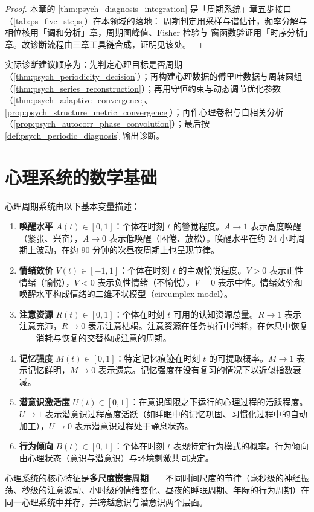 \begin{proof}
本章的 \cref{thm:psych_diagnosis_integration} 是「周期系统」章五步接口（\cref{tab:ps_five_steps}）在本领域的落地：
周期判定用采样与谱估计，频率分解与相位核用「调和分析」章，周期图峰值、Fisher 检验与
窗函数验证用「时序分析」章。故诊断流程由三章工具链合成，证明见该处。
\end{proof}

\begin{remark}[整合后的操作顺序]\label{rem:psych_integration_order}
实际诊断建议顺序为：先判定心理目标是否周期（\cref{thm:psych_periodicity_decision}）；再构建心理数据的傅里叶数据与周转圆组（\cref{thm:psych_series_reconstruction}）；再用守恒约束与动态调节优化参数（\cref{thm:psych_adaptive_convergence}、\cref{prop:psych_structure_metric_convergence}）；再作心理卷积与自相关分析（\cref{prop:psych_autocorr_phase_convolution}）；最后按 \cref{def:psych_periodic_diagnosis} 输出诊断。
\end{remark}

\section{心理系统的数学基础}

\begin{definition}[心理周期系统的基本量]\label{def:psychological_quantities}
心理周期系统由以下基本变量描述：
\begin{enumerate}[label=(\roman*)]
    \item \textbf{唤醒水平} $A(t) \in [0,1]$：个体在时刻 $t$ 的警觉程度。$A \to 1$ 表示高度唤醒（紧张、兴奋），$A \to 0$ 表示低唤醒（困倦、放松）。唤醒水平在约 24 小时周期上波动，在约 90 分钟的次昼夜周期上也呈现节律。
    \item \textbf{情绪效价} $V(t) \in [-1,1]$：个体在时刻 $t$ 的主观愉悦程度。$V > 0$ 表示正性情绪（愉悦），$V < 0$ 表示负性情绪（不愉悦），$V = 0$ 表示中性。情绪效价和唤醒水平构成情绪的二维环状模型（circumplex model）。
    \item \textbf{注意资源} $R(t) \in [0,1]$：个体在时刻 $t$ 可用的认知资源总量。$R \to 1$ 表示注意充沛，$R \to 0$ 表示注意枯竭。注意资源在任务执行中消耗，在休息中恢复——消耗与恢复的交替构成注意的周期。
    \item \textbf{记忆强度} $M(t) \in [0,1]$：特定记忆痕迹在时刻 $t$ 的可提取概率。$M \to 1$ 表示记忆鲜明，$M \to 0$ 表示遗忘。记忆强度在没有复习的情况下以近似指数衰减。
    \item \textbf{潜意识激活度} $U(t) \in [0,1]$：在意识阈限之下运行的心理过程的活跃程度。$U \to 1$ 表示潜意识过程高度活跃（如睡眠中的记忆巩固、习惯化过程中的自动加工），$U \to 0$ 表示潜意识过程处于静息状态。
    \item \textbf{行为倾向} $B(t) \in [0,1]$：个体在时刻 $t$ 表现特定行为模式的概率。行为倾向由心理状态（意识与潜意识）与环境刺激共同决定。
\end{enumerate}
心理系统的核心特征是\textbf{多尺度嵌套周期}——不同时间尺度的节律（毫秒级的神经振荡、秒级的注意波动、小时级的情绪变化、昼夜的睡眠周期、年际的行为周期）在同一心理系统中并存，并跨越意识与潜意识两个层面。
\end{definition}


